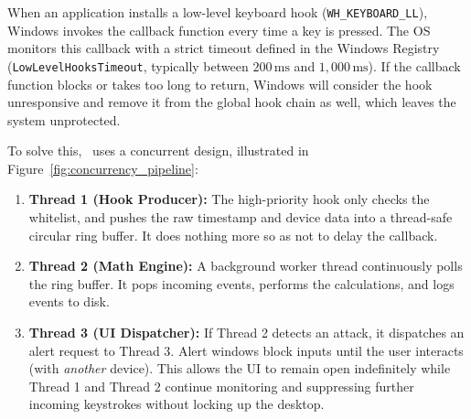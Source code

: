 When an application installs a low-level keyboard hook (\texttt{WH\_KEYBOARD\_LL}), Windows invokes the callback function every time a key is pressed. The OS monitors this callback with a strict timeout defined in the Windows Registry (\texttt{LowLevelHooksTimeout}, typically between $200\,\text{ms}$ and $1,000\,\text{ms}$). If the callback function blocks or takes too long to return, Windows will consider the hook unresponsive and remove it from the global hook chain as well, which leaves the system unprotected.

To solve this, \projectNameFormatted\ uses a concurrent design, illustrated in Figure~\ref{fig:concurrency_pipeline}:



\begin{enumerate}
	\item \textbf{Thread 1 (Hook Producer):} The high-priority hook only checks the whitelist, and pushes the raw timestamp and device data into a thread-safe circular ring buffer. It does nothing more so as not to delay the callback.
	\item \textbf{Thread 2 (Math Engine):} A background worker thread continuously polls the ring buffer. It pops incoming events, performs the calculations, and logs events to disk.
	\item \textbf{Thread 3 (UI Dispatcher):} If Thread 2 detects an attack, it dispatches an alert request to Thread 3. Alert windows block inputs until the user interacts (with \textit{another} device). This allows the UI to remain open indefinitely while Thread 1 and Thread 2 continue monitoring and suppressing further incoming keystrokes without locking up the desktop.
\end{enumerate}

